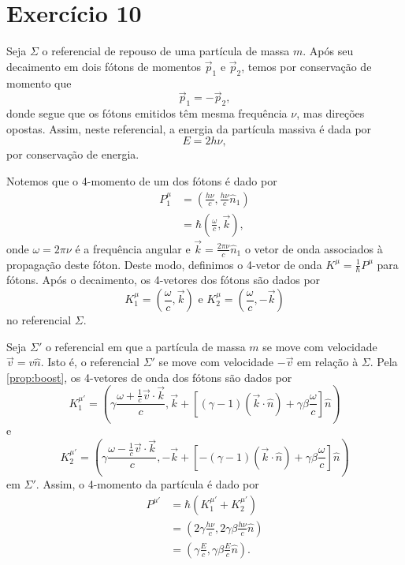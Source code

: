 \section*{Exercício 10}
Seja \(\Sigma\) o referencial de repouso de uma partícula de massa \(m\). Após seu decaimento em dois fótons de momentos \(\vec{p}_1 \) e \(\vec{p}_2\), temos por conservação de momento que
\begin{equation*}
    \vec{p}_1 = -\vec{p}_2,
\end{equation*}
donde segue que os fótons emitidos têm mesma frequência \(\nu\), mas direções opostas. Assim, neste referencial, a energia da partícula massiva é dada por
\begin{equation*}
    E = 2h\nu,
\end{equation*}
por conservação de energia.

Notemos que  o 4-momento de um dos fótons é dado por
\begin{align*}
    P_1^\mu &= \left(\frac{h \nu}{c}, \frac{h\nu}{c}\hat{n}_1\right)\\
            &= \hbar \left(\frac{\omega}{c}, \vec{k}\right),
\end{align*}
onde \(\omega = 2\pi \nu\) é a frequência angular e \(\vec{k} = \frac{2\pi \nu}{c}\hat{n}_1\) o vetor de onda associados à propagação deste fóton. Deste modo, definimos o 4-vetor de onda \(K^\mu = \frac{1}{\hbar} P^\mu\) para fótons. Após o decaimento, os 4-vetores dos fótons são dados por
\begin{equation*}
    K_1^\mu = \left(\frac{\omega}{c}, \vec{k}\right) \text{ e }K_2^\mu = \left(\frac{\omega}{c}, -\vec{k}\right)
\end{equation*}
no referencial \(\Sigma\).

Seja \(\Sigma'\) o referencial em que a partícula de massa \(m\) se move com velocidade \(\vec{v} = v \hat{n}\). Isto é, o referencial \(\Sigma'\) se move com velocidade \(-\vec{v}\) em relação à \(\Sigma\). Pela \cref{prop:boost}, os 4-vetores de onda dos fótons são dados por
\begin{equation*}
    K_1^{\mu'} = \left(\gamma\frac{\omega + \frac{1}{c} \vec{v} \cdot \vec{k}}{c}, \vec{k} + \left[(\gamma - 1)(\vec{k} \cdot \hat{n}) + \gamma \beta \frac{\omega}{c} \right] \hat{n}\right)
\end{equation*}
e
\begin{equation*}
    K_2^{\mu'} = \left(\gamma\frac{\omega - \frac{1}{c} \vec{v} \cdot \vec{k}}{c}, -\vec{k} + \left[-(\gamma - 1)(\vec{k} \cdot \hat{n}) + \gamma \beta \frac{\omega}{c} \right] \hat{n}\right)
\end{equation*}
em \(\Sigma'\). Assim, o 4-momento da partícula é dado por
\begin{align*}
    P^{\mu'} &= \hbar \left(K_1^{\mu'} + K_2^{\mu'}\right)\\
    &= \left(2\gamma\frac{h\nu}{c}, 2\gamma \beta \frac{h\nu}{c}\hat{n}\right)\\
    &= \left(\gamma \frac{E}{c}, \gamma \beta \frac{E}{c} \hat{n}\right).
\end{align*}

